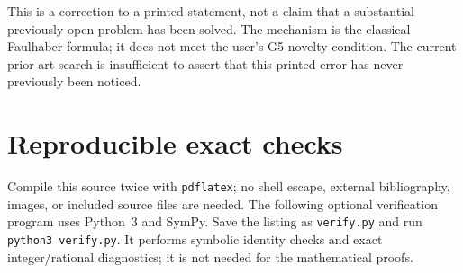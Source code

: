 \documentclass[11pt,a4paper]{article}
\theoremstyle{definition}
\theoremstyle{remark}
\begin{document}
This is a correction to a printed statement, not a claim that a
substantial previously open problem has been solved.  The mechanism is
the classical Faulhaber formula; it does not meet the user's G5 novelty
condition.  The current prior-art search is insufficient to assert that
this printed error has never previously been noticed.


\section{Reproducible exact checks}
\label{app:checks}

Compile this source twice with \texttt{pdflatex}; no shell escape,
external bibliography, images, or included source files are needed.
The following optional verification program uses Python~3 and SymPy.
Save the listing as \texttt{verify.py} and run \texttt{python3 verify.py}.
It performs symbolic identity checks and exact integer/rational
diagnostics; it is not needed for the mathematical proofs.
\end{document}

